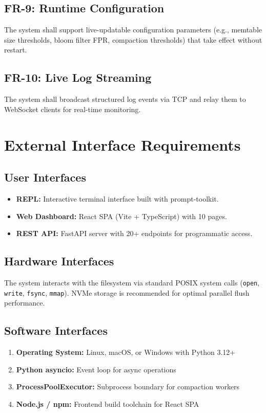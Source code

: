 \documentclass[oneside,a4paper,12pt]{book}
\begin{document}
\subsection{FR-9: Runtime Configuration}
The system shall support live-updatable configuration parameters (e.g., memtable size thresholds, bloom filter FPR, compaction thresholds) that take effect without restart.

\subsection{FR-10: Live Log Streaming}
The system shall broadcast structured log events via TCP and relay them to WebSocket clients for real-time monitoring.

\section{External Interface Requirements}

\subsection{User Interfaces}
\begin{itemize}[leftmargin=2em]
    \item \textbf{REPL:} Interactive terminal interface built with prompt-toolkit.
    \item \textbf{Web Dashboard:} React SPA (Vite + TypeScript) with 10 pages.
    \item \textbf{REST API:} FastAPI server with 20+ endpoints for programmatic access.
\end{itemize}

\subsection{Hardware Interfaces}
The system interacts with the filesystem via standard POSIX system calls (\texttt{open}, \texttt{write}, \texttt{fsync}, \texttt{mmap}). NVMe storage is recommended for optimal parallel flush performance.

\subsection{Software Interfaces}
\begin{enumerate}[leftmargin=2em]
    \item \textbf{Operating System:} Linux, macOS, or Windows with Python 3.12+
    \item \textbf{Python asyncio:} Event loop for async operations
    \item \textbf{ProcessPoolExecutor:} Subprocess boundary for compaction workers
    \item \textbf{Node.js / npm:} Frontend build toolchain for React SPA
\end{enumerate}
\end{document}
